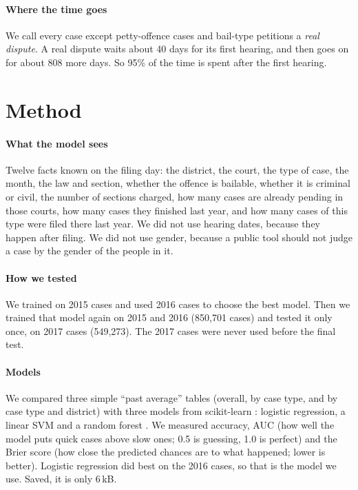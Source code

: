 \documentclass[11pt,a4paper]{article}
\begin{document}
\paragraph*{Where the time goes} We call every case except petty-offence cases and bail-type
petitions a \emph{real dispute}. A real dispute waits about 40 days for its first hearing, and then
goes on for about 808 more days. So 95\% of the time is spent after the first hearing.

\section{Method}

\paragraph*{What the model sees} Twelve facts known on the filing day: the district, the court,
the type of case, the month, the law and section, whether the offence is bailable, whether it is
criminal or civil, the number of sections charged, how many cases are already pending in those
courts, how many cases they finished last year, and how many cases of this type were filed there
last year. We did not use hearing dates, because they happen after filing. We did not use gender,
because a public tool should not judge a case by the gender of the people in it.

\paragraph*{How we tested} We trained on 2015 cases and used 2016 cases to choose the best model.
Then we trained that model again on 2015 and 2016 (850,701 cases) and tested it only once, on 2017
cases (549,273). The 2017 cases were never used before the final test.

\paragraph*{Models} We compared three simple ``past average'' tables (overall, by case type, and by
case type and district) with three models from scikit-learn \cite{sklearn}: logistic regression, a
linear SVM and a random forest \cite{rf}. We measured accuracy, AUC \cite{auc} (how well the model
puts quick cases above slow ones; 0.5 is guessing, 1.0 is perfect) and the Brier score \cite{brier}
(how close the predicted chances are to what happened; lower is better). Logistic regression did
best on the 2016 cases, so that is the model we use. Saved, it is only 6\,kB.
\end{document}
